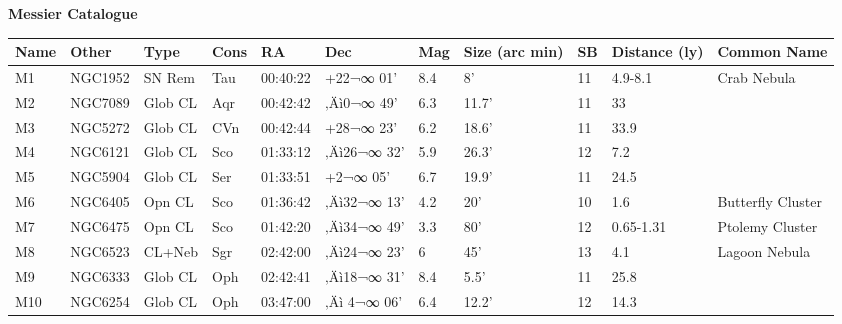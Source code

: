 \documentclass[10pt,twoside,a4paper,english]{report}
\begin{document}
{\bf Messier Catalogue} 
\begin{longtable}{@{}lllllllllll@{}} 
\hline 
{\bf Name} & {\bf Other} & {\bf Type} & {\bf Cons} & {\bf RA}  & {\bf Dec} & {\bf Mag} & {\bf Size (arc min)} & {\bf SB} & {\bf Distance (ly)} & {\bf Common Name}               \\ 
\hline 
M1         & NGC1952     & SN Rem     & Tau       & 00:40:22 & +22¬∞ 01'  & 8.4       & 8'                   & 11       & 4.9-8.1             & Crab Nebula                               \\ 
M2         & NGC7089     & Glob CL    & Aqr       & 00:42:42 & ‚Äì0¬∞ 49'   & 6.3       & 11.7'                & 11       & 33                  &                                           \\ 
M3         & NGC5272     & Glob CL    & CVn       & 00:42:44 & +28¬∞ 23'  & 6.2       & 18.6'                & 11       & 33.9                &                                           \\ 
M4         & NGC6121     & Glob CL    & Sco       & 01:33:12 & ‚Äì26¬∞ 32'  & 5.9       & 26.3'                & 12       & 7.2                 &                                           \\ 
M5         & NGC5904     & Glob CL    & Ser       & 01:33:51 & +2¬∞ 05'   & 6.7       & 19.9'                & 11       & 24.5                &                                           \\ 
M6         & NGC6405     & Opn CL     & Sco       & 01:36:42 & ‚Äì32¬∞ 13'  & 4.2       & 20'                  & 10       & 1.6                 & Butterfly Cluster                         \\ 
M7         & NGC6475     & Opn CL     & Sco       & 01:42:20 & ‚Äì34¬∞ 49'  & 3.3       & 80'                  & 12       & 0.65-1.31           & Ptolemy Cluster                           \\ 
M8         & NGC6523     & CL+Neb     & Sgr       & 02:42:00 & ‚Äì24¬∞ 23'  & 6         & 45'                  & 13       & 4.1                 & Lagoon Nebula                             \\ 
M9         & NGC6333     & Glob CL    & Oph       & 02:42:41 & ‚Äì18¬∞ 31'  & 8.4       & 5.5'                 & 11       & 25.8                &                                           \\ 
M10        & NGC6254     & Glob CL    & Oph       & 03:47:00 & ‚Äì 4¬∞ 06'  & 6.4       & 12.2'                & 12       & 14.3                &                                           \\ 

\end{longtable}
\end{document}
